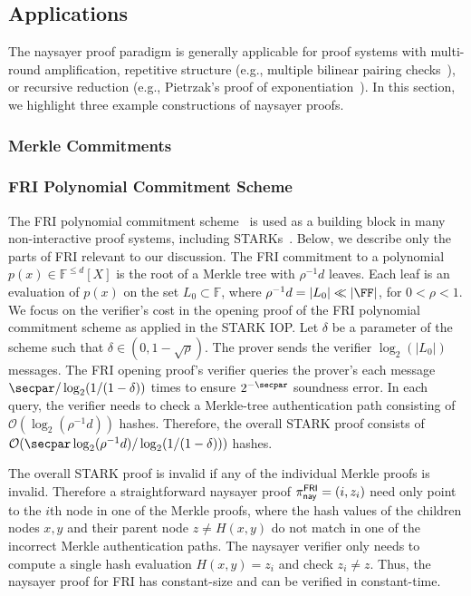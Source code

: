 \subsection{Applications}\label{sec:naysayer_apps}

The naysayer proof paradigm is generally applicable for proof systems with multi-round amplification, repetitive structure (e.g., multiple bilinear pairing checks~\cite{EPRINT:GabWilCio19}), or recursive reduction (e.g., Pietrzak's proof of exponentiation~\cite{ITCS:Pietrzak19b}). In this section, we highlight three example constructions of naysayer proofs.

\subsubsection{Merkle Commitments}\label{sec:merkle_naysayer}



\subsubsection{FRI Polynomial Commitment Scheme}\label{sec:fri_naysayer}

The FRI polynomial commitment scheme~\cite{EPRINT:BBHR18} is used as a building block in many non-interactive proof systems, including STARKs~\cite{STOC:BCGT13}.
Below, we describe only the parts of FRI relevant to our discussion. The FRI commitment to a polynomial $p(x)\in\mathbb{F}^{\leq d}[X]$ is the root of a Merkle tree with $\rho^{-1}d$ leaves. 
Each leaf is an evaluation of $p(x)$ on the set $L_0\subset\mathbb{F}$, where $\rho^{-1}d=\vert L_0\vert\ll\vert\FF\vert$, for $0<\rho<1$. We focus on the verifier's cost in the opening proof of the FRI polynomial commitment scheme as applied in the STARK IOP. Let $\delta$ be a parameter of the scheme such that $\delta\in(0,1-\sqrt{\rho})$. The prover sends the verifier $\log_2(\vert L_0\vert)$ messages. The FRI opening proof's verifier queries the prover's each message $\secpar/\log_2(1/(1-\delta))$ times to ensure $2^{-\secpar}$ soundness error. In each query, the verifier needs to check a Merkle-tree authentication path consisting of $\mathcal{O}(\log_2(\rho^{-1}d))$ hashes. Therefore, the overall STARK proof consists of $\mathcal{O}(\secpar\log_2(\rho^{-1}d)/\log_2(1/(1-\delta)))$ hashes. 

The overall STARK proof is invalid if any of the individual Merkle proofs is invalid. Therefore a straightforward naysayer proof $\pi^{\mathsf{FRI}}_{\mathsf{nay}}=(i,z_{i})$ need only point to the $i$th node in one of the Merkle proofs, where the hash values of the children nodes $x,y$ and their parent node $z\neq H(x,y)$ do not match in one of the incorrect Merkle authentication paths. The naysayer verifier only needs to compute a single hash evaluation $H(x,y)=z_{i}$ and check $z_{i}\neq z$. Thus, the naysayer proof for FRI has constant-size and can be verified in constant-time. 

